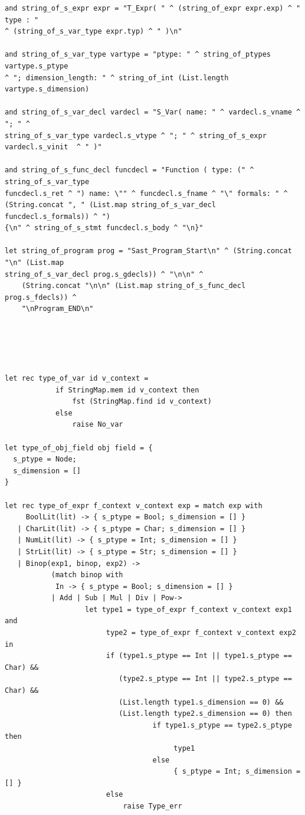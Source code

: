 \documentclass[a4paper,12pt]{article}
\begin{document}
\begin{lstlisting}
and string_of_s_expr expr = "T_Expr( " ^ (string_of_expr expr.exp) ^ " type : "
^ (string_of_s_var_type expr.typ) ^ " )\n"

and string_of_s_var_type vartype = "ptype: " ^ string_of_ptypes vartype.s_ptype
^ "; dimension_length: " ^ string_of_int (List.length vartype.s_dimension)

and string_of_s_var_decl vardecl = "S_Var( name: " ^ vardecl.s_vname ^ "; " ^
string_of_s_var_type vardecl.s_vtype ^ "; " ^ string_of_s_expr vardecl.s_vinit  ^ " )"

and string_of_s_func_decl funcdecl = "Function ( type: (" ^ string_of_s_var_type
funcdecl.s_ret ^ ") name: \"" ^ funcdecl.s_fname ^ "\" formals: " ^
(String.concat ", " (List.map string_of_s_var_decl funcdecl.s_formals)) ^ ")
{\n" ^ string_of_s_stmt funcdecl.s_body ^ "\n}"

let string_of_program prog = "Sast_Program_Start\n" ^ (String.concat "\n" (List.map
string_of_s_var_decl prog.s_gdecls)) ^ "\n\n" ^
    (String.concat "\n\n" (List.map string_of_s_func_decl prog.s_fdecls)) ^
    "\nProgram_END\n"





let rec type_of_var id v_context = 
            if StringMap.mem id v_context then 
                fst (StringMap.find id v_context)
            else
                raise No_var

let type_of_obj_field obj field = {
  s_ptype = Node;
  s_dimension = []
}

let rec type_of_expr f_context v_context exp = match exp with
     BoolLit(lit) -> { s_ptype = Bool; s_dimension = [] }
   | CharLit(lit) -> { s_ptype = Char; s_dimension = [] }
   | NumLit(lit) -> { s_ptype = Int; s_dimension = [] }
   | StrLit(lit) -> { s_ptype = Str; s_dimension = [] }
   | Binop(exp1, binop, exp2) -> 
           (match binop with
            In -> { s_ptype = Bool; s_dimension = [] } 
           | Add | Sub | Mul | Div | Pow-> 
                   let type1 = type_of_expr f_context v_context exp1 and 
                        type2 = type_of_expr f_context v_context exp2 in
                        if (type1.s_ptype == Int || type1.s_ptype == Char) &&
                           (type2.s_ptype == Int || type2.s_ptype == Char) &&
                           (List.length type1.s_dimension == 0) && 
                           (List.length type2.s_dimension == 0) then
                                   if type1.s_ptype == type2.s_ptype then
                                        type1
                                   else
                                        { s_ptype = Int; s_dimension = [] }
                        else
                            raise Type_err


\end{lstlisting}
\end{document}
